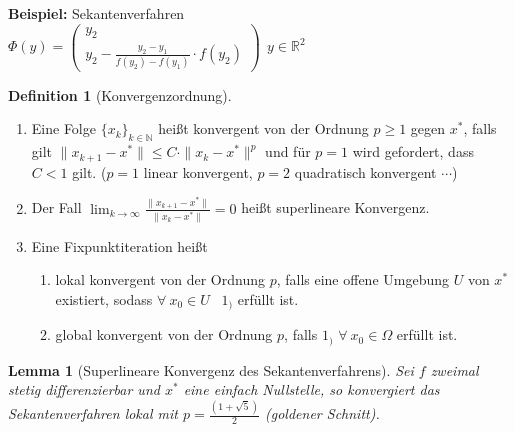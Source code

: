 \documentclass[10pt,a4paper]{article}
\newtheorem{lemma}{Lemma}[section]
\theoremstyle{definition} \newtheorem{definition}{Definition}[section]
\theoremstyle{remark}     \newtheorem*{bemerkung}{\textbf{Bemerkung}} %
\begin{document}
\textbf{Beispiel:} Sekantenverfahren
\\\hspace*{8mm}$\Phi(y)=\begin{pmatrix} y_2 \\ y_2-\frac{y_2-y_1}{f(y_2)-f(y_1)}\cdot f(y_2)\end{pmatrix} \ \ y\in \mathbb{R}^2$\\
\newline

\begin{definition}[Konvergenzordnung]
~
\begin{enumerate}
\item Eine Folge $\{x_k \}_{k\in\mathbb{N}}$ heißt konvergent von der Ordnung $p\geq 1$ gegen $x^*$,
falls gilt $\| x_{k+1}-x^*\|\leq C\cdot \|x_k-x^*\|^p$ und für $p=1$ wird gefordert, dass $C<1$ gilt.
($p=1$ linear konvergent, $p=2$ quadratisch konvergent $\cdots$)
\item Der Fall $\lim_{k \to \infty}\frac{\|x_{k+1}-x^*\|}{\|x_k -x^*\|}=0$ heißt superlineare Konvergenz.
\item Eine Fixpunktiteration heißt
  \begin{enumerate}
  \item lokal konvergent von der Ordnung $p$, falls eine offene Umgebung $U$ von $x^*$ existiert,
        sodass $\forall \ x_0\in U$ \ $1_)$ erfüllt ist.
  \item global konvergent von der Ordnung $p$, falls $1_)$ $\forall \ x_0\in \Omega$ erfüllt ist.
  \end{enumerate}
\end{enumerate}
\end{definition}

\begin{lemma}[Superlineare Konvergenz des Sekantenverfahrens]
Sei $f$ zweimal stetig differenzierbar und $x^*$ eine einfach Nullstelle, so konvergiert das Sekantenverfahren lokal mit $p=\frac{(1+\sqrt{5})}{2}$ (goldener Schnitt).
\end{lemma}
\end{document}

